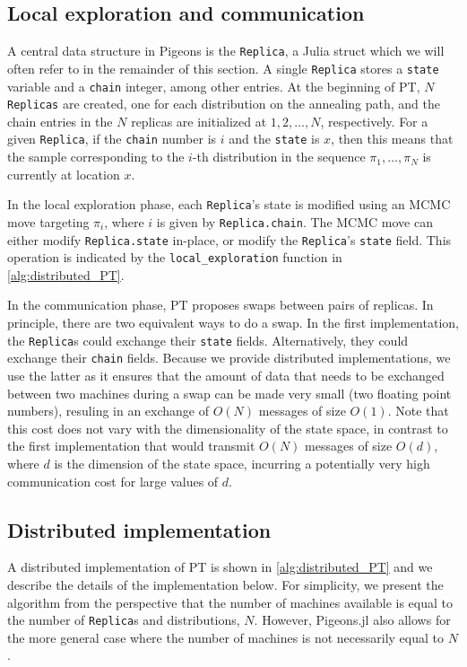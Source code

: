 \subsection{Local exploration and communication}
A central data structure in Pigeons is the \texttt{Replica}, a Julia struct 
which we will often refer to in the remainder of this section. 
A single \texttt{Replica} stores a \texttt{state} variable and a \texttt{chain} 
integer, among other entries. 
At the beginning of PT, $N$ \texttt{Replicas} are created, 
one for each distribution on the annealing path, and 
the chain entries in the $N$ replicas are initialized at $1,2,\ldots,N$, respectively. 
For a given \texttt{Replica}, if the \texttt{chain} number is $i$ and the \texttt{state}
is $x$, then this means that the sample corresponding to the $i$-th distribution in 
the sequence $\pi_1, \ldots, \pi_N$ is currently at location $x$.  

\medskip 
In the local exploration phase,
each \texttt{Replica}'s state is modified using an MCMC move targeting $\pi_i$,
where $i$ is given by \texttt{Replica.chain}.
The MCMC move can either modify \texttt{Replica.state} in-place, or modify the 
\texttt{Replica}'s \texttt{state} field. 
This operation is indicated by the \texttt{local\_exploration} function in 
\cref{alg:distributed_PT}.

\medskip 
In the communication phase, PT proposes swaps between pairs of replicas. 
In principle, there are two equivalent ways to do a swap.
In the first implementation, the \texttt{Replica}s 
could exchange their \texttt{state} fields.
Alternatively, they could exchange their \texttt{chain} fields.
Because we provide distributed implementations, we use the latter as it ensures that 
the amount of data that needs to be exchanged between two machines during a swap 
can be made very small (two floating point numbers), resuling in 
an exchange of $O(N)$ messages of size $O(1)$. 
Note that this cost does not vary with the dimensionality of the state space, 
in contrast to the first implementation that would transmit 
$O(N)$ messages of size $O(d)$, where $d$ is the dimension of the state space,
incurring a potentially very high communication cost for large values of $d$.


\subsection{Distributed implementation}
A distributed implementation of PT is shown in \cref{alg:distributed_PT}
and we describe the details of the implementation below.
For simplicity, we present the algorithm from the perspective that the number of machines available 
is equal to the number of \texttt{Replica}s and distributions, $N$. 
However, Pigeons.jl also allows for the more general case where the number of 
machines is not necessarily equal to $N$.

